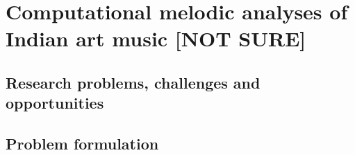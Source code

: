 \chapter{Computational melodic analyses of Indian art music [NOT SURE]}

\section{Research problems, challenges and opportunities}

\section{Problem formulation}